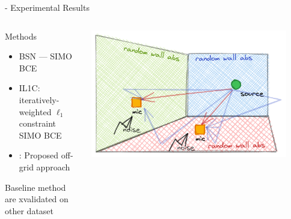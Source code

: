 \begin{frame}[t]{\blaster - Experimental Results}
    \begin{columns}[onlytextwidth]
        \begin{column}{0.45\textwidth}
            \begin{block}{Methods}
                \begin{itemize}
                    \item BSN --- SIMO BCE\cite{lin2007blind}
                    \item IL1C: iteratively-weighted $\ell_1$ constraint SIMO BCE
                    \\\cite{crocco2015room}
                    \item \blaster: Proposed off-grid approach
                \end{itemize}
            Baseline method are xvalidated on other dataset
            \end{block}
        \end{column}

        \begin{column}{0.45\textwidth}
            \includegraphics[width=0.9\textwidth]{figures/aer_scenario4.png}
        \end{column}
    \end{columns}


\end{frame}
